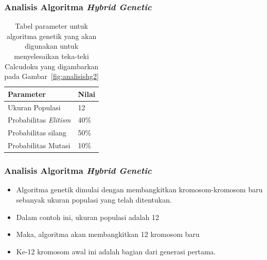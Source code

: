 \documentclass{beamer}
\begin{document}
\begin{frame}
\frametitle{Analisis Algoritma \textit{Hybrid Genetic}}
\begin{table}
\centering
\captionsetup{justification=centering}
\begin{tabular}{| l | l |}
\hline
Parameter & Nilai \\
\hline \hline
Ukuran Populasi & 12 \\
\hline
Probabilitas \textit{Elitism} & 40\% \\
\hline
Probabilitas silang & 50\% \\
\hline
Probabilitas Mutasi & 10\% \\
\hline
\end{tabular}
\caption[Tabel parameter untuk algoritma genetik yang akan digunakan untuk menyelesaikan teka-teki Calcudoku yang digambarkan pada Gambar~\ref{fig:analisishg2}]{Tabel parameter untuk algoritma genetik yang akan digunakan untuk menyelesaikan teka-teki Calcudoku yang digambarkan pada Gambar~\ref{fig:analisishg2}}
\label{tab:analisishg1}
\end{table}
\end{frame}

\note{

}

\begin{frame}
\frametitle{Analisis Algoritma \textit{Hybrid Genetic}}
\begin{itemize}
\item Algoritma genetik dimulai dengan membangkitkan kromosom-kromosom baru sebanyak ukuran populasi yang telah ditentukan.
\item Dalam contoh ini, ukuran populasi adalah 12
\item Maka, algoritma akan membangkitkan 12 kromosom baru
\item Ke-12 kromosom awal ini adalah bagian dari generasi pertama.
\end{itemize}
\end{frame}

\end{document}
